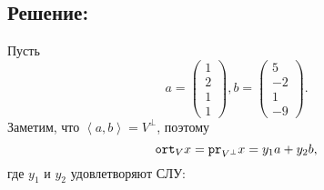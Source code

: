 \documentclass[12pt]{article}
\begin{document}
    \subsection*{Решение:}
    Пусть
    \[
        a =
        \begin{pmatrix}
            1 \\ 2 \\ 1 \\ 1
        \end{pmatrix},
        b =
        \begin{pmatrix}
            5 \\ -2 \\ 1 \\ -9
        \end{pmatrix}.
    \]
    Заметим, что $\left < a, b \right > = V^\perp$, поэтому
    \[
        \texttt{ort}_{V} {x} = \texttt{pr}_{V^\perp} {x} = y_1 a + y_2 b,
    \]
    где $y_1$ и $y_2$ удовлетворяют СЛУ:
\end{document}
